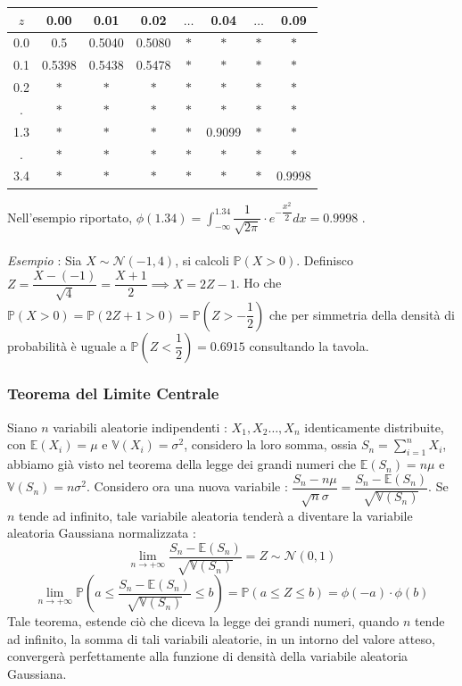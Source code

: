 \documentclass[12pt, letterpaper]{article}
\newcommand{\E}{{\mathbb E}}
\newcommand{\V}{{\mathbb V}}
\newcommand{\acc}{\\\hphantom{}\\}
\newcommand{\Prob}{{\mathbb P}}
\begin{document}
\begin{center}
    \begin{tabular}{|c|c|c|c|c|c|c|c|}
        \hline
        \(z\) & 0.00   & \cellcolor[HTML]{FFFFFF}0.01 & 0.02   & \(\dots\) & 0.04                           & \(\dots\) & 0.09   \\ \hline
        0.0   & 0.5    & 0.5040                       & 0.5080 & \(*\)     & \(*\)                          & \(*\)     & \(*\)  \\ \hline
        0.1   & 0.5398 & 0.5438                       & 0.5478 & \(*\)     & \(*\)                          & \(*\)     & \(*\)  \\ \hline
        0.2   & \(*\)  & \(*\)                        & \(*\)  & \(*\)     & \(*\)                          & \(*\)     & \(*\)  \\ \hline
        .     & \(*\)  & \(*\)                        & \(*\)  & \(*\)     & \(*\)                          & \(*\)     & \(*\)  \\ \hline
        1.3   & \(*\)  & \(*\)                        & \(*\)  & \(*\)     & \cellcolor[HTML]{FFCCC9}0.9099 & \(*\)     & \(*\)  \\ \hline
        .     & \(*\)  & \(*\)                        & \(*\)  & \(*\)     & \(*\)                          & \(*\)     & \(*\)  \\ \hline
        3.4   & \(*\)  & \(*\)                        & \(*\)  & \(*\)     & \(*\)                          & \(*\)     & 0.9998 \\ \hline
        \end{tabular}
\end{center}
Nell'esempio riportato, \(\phi(1.34)=\displaystyle\int_{-\infty}^{1.34} \dfrac{1}{\sqrt{2\pi}}\cdot e^{-\dfrac{x^2}{2}}dx=0.9998\) .\acc 
\textit{Esempio} : Sia \(X\sim \mathcal{N}(-1,4)\), si calcoli \(\Prob(X>0)\). Definisco \(Z=\dfrac{X-(-1)}{\sqrt{4}}
=\dfrac{X+1}{2}\implies X=2Z-1\). Ho che \(\Prob(X>0)=\Prob(2Z+1>0)=\Prob(Z>-\dfrac{1}{2})\) che 
per simmetria della densità di probabilità è uguale a \(\Prob(Z<\dfrac{1}{2})=0.6915\) consultando la tavola.
\subsubsection{Teorema del Limite Centrale}
Siano \(n\) variabili aleatorie indipendenti : \(X_1,X_2\dots,X_n\) identicamente distribuite, 
con \(\E(X_i)=\mu\) e \(\V(X_i)=\sigma^2\), considero la loro somma, ossia \(S_n=\displaystyle
\sum_{i=1}^nX_i\), abbiamo già visto nel teorema della legge dei grandi numeri 
che \(\E(S_n)=n\mu\) e \(\V(S_n)=n\sigma^2\). Considero ora una nuova variabile : \(\dfrac{S_n-n\mu}{\sqrt{n}\sigma}=
\dfrac{S_n-\E(S_n)}{\sqrt{\V(S_n)}}\). Se \(n\) tende ad infinito, tale variabile aleatoria tenderà 
a diventare la variabile aleatoria Gaussiana normalizzata : 
$$\lim_{n\rightarrow +\infty}\dfrac{S_n-\E(S_n)}{\sqrt{\V(S_n)}}=Z\sim\mathcal{N}(0,1)$$
$$\lim_{n\rightarrow +\infty}\Prob(a\le \dfrac{S_n-\E(S_n)}{\sqrt{\V(S_n)}}\le b)=\Prob(a\le Z\le b)=\phi(-a)\cdot \phi(b)$$
Tale teorema, estende ciò che diceva la legge dei grandi numeri, quando \(n\) tende ad infinito, 
la somma di tali variabili aleatorie, in un intorno del valore atteso, convergerà perfettamente 
alla funzione di densità della variabile aleatoria Gaussiana.
\end{document}
